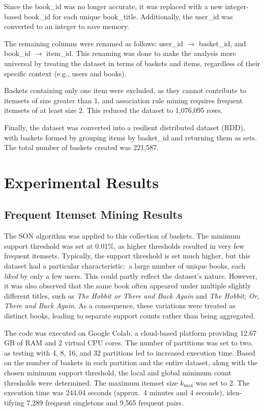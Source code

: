 \documentclass{Class/julia}
\begin{document}
Since the book\_id was no longer accurate, it was replaced with a new integer-based book\_id for each unique book\_title. Additionally, the user\_id was converted to an integer to save memory.

The remaining columns were renamed as follows: user\_id $\rightarrow$ basket\_id, and book\_id $\rightarrow$ item\_id. This renaming was done to make the analysis more universal by treating the dataset in terms of baskets and items, regardless of their specific context (e.g., users and books).

Baskets containing only one item were excluded, as they cannot contribute to itemsets of size greater than 1, and association rule mining requires frequent itemsets of at least size 2. This reduced the dataset to 1,076,095 rows.

Finally, the dataset was converted into a resilient distributed dataset (RDD), with baskets formed by grouping items by basket\_id and returning them as sets. The total number of baskets created was 221,587.
 
\section{Experimental Results}\label{sec:4}

\subsection{Frequent Itemset Mining Results}

The SON algorithm was applied to this collection of baskets. The minimum support threshold was set at 0.01\%, as higher thresholds resulted in very few frequent itemsets. Typically, the support threshold is set much higher, but this dataset had a particular characteristic:\ a large number of unique books, each \textit{liked} by only a few users. This could partly reflect the dataset's nature. However, it was also observed that the same book often appeared under multiple slightly different titles, such as \textit{The Hobbit or There and Back Again} and \textit{The Hobbit; Or, There and Back Again}. As a consequence, these variations were treated as distinct books, leading to separate support counts rather than being aggregated.

The code was executed on Google Colab, a cloud-based platform providing 12.67 GB of RAM and 2 virtual CPU cores. The number of partitions was set to two, as testing with 4, 8, 16, and 32 partitions led to increased execution time. Based on the number of baskets in each partition and the entire dataset, along with the chosen minimum support threshold, the local and global minimum count thresholds were determined. The maximum itemset size \( k_{\max} \) was set to 2. The execution time was 244.04 seconds (approx.\ 4 minutes and 4 seconds), iden- tifying 7,289 frequent singletons and 9,565 frequent pairs.
\end{document}
